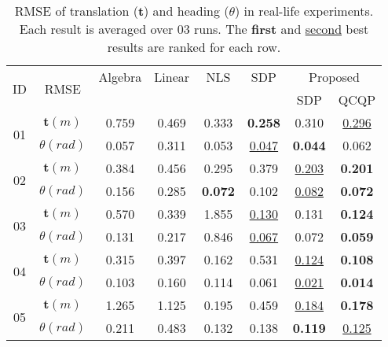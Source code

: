 \documentclass[journal]{IEEEtran}
\begin{document}
\begin{table}[t]
\centering
\begin{adjustbox}{width=\columnwidth}
    \begin{tabular}[t]{
    @{\hskip3pt}c@{\hskip3pt}|
    @{\hskip3pt}c@{\hskip3pt}|
    @{\hskip2pt}c@{\hskip2pt}|
    @{\hskip2pt}c@{\hskip2pt}|
    c|c|c|c}
    \toprule
    \multirow{2}{*}{ID} & \multirow{2}{*}{RMSE} &
        Algebra & Linear & NLS & SDP & \multicolumn{2}{c}{Proposed} \\
    \cline{7-8}
    & &
        \cite{trawny2010rel3Dtransform} & \cite{molina2019unique} &
        \cite{ziegler2021distributed} & \cite{jiang2020rel3D} &
        SDP & QCQP \\
    \hline
    \multirow{2}{*}{01}
    & $\mathbf{t} (\si{m})$ & 
        0.759 & 0.469 & 0.333 & \textbf{0.258} & 0.310 & \underline{0.296} \\
    & ${\theta} (\si{rad})$ & 
        0.057 & 0.311 & 0.053 & \underline{0.047} & \textbf{0.044} & 0.062 \\
    \hline
    \multirow{2}{*}{02}
    & $\mathbf{t} (\si{m})$ & 
        0.384 & 0.456 & 0.295 & 0.379 & \underline{0.203} & \textbf{0.201} \\
    & ${\theta} (\si{rad})$ & 
        0.156 & 0.285 & \textbf{0.072} & 0.102 & \underline{0.082} & \textbf{0.072} \\
    \hline
    \multirow{2}{*}{03}
    & $\mathbf{t} (\si{m})$ & 
        0.570 & 0.339 & 1.855 & \underline{0.130} & 0.131 & \textbf{0.124} \\
    & ${\theta} (\si{rad})$ & 
        0.131 & 0.217 & 0.846 & \underline{0.067} & 0.072 & \textbf{0.059} \\
    \hline
    \multirow{2}{*}{04}
    & $\mathbf{t} (\si{m})$ & 
        0.315 & 0.397 & 0.162 & 0.531 & \underline{0.124} & \textbf{0.108} \\
    & ${\theta} (\si{rad})$ & 
        0.103 & 0.160 & 0.114 & 0.061 & \underline{0.021} & \textbf{0.014} \\
    \hline
    \multirow{2}{*}{05}
    & $\mathbf{t} (\si{m})$ & 
        1.265 & 1.125 & 0.195 & 0.459 & \underline{0.184} & \textbf{0.178} \\
    & ${\theta} (\si{rad})$ & 
        0.211 & 0.483 & 0.132 & 0.138 & \textbf{0.119} & \underline{0.125} \\
    \bottomrule
    \end{tabular}
\end{adjustbox}
\caption{RMSE of translation ($\mathbf{t}$) and heading (${\theta}$) in real-life experiments. Each result is averaged over 03 runs. The \textbf{first} and \underline{second} best results are ranked for each row.}
\label{table:results_real_life}
\end{table}
\end{document}
